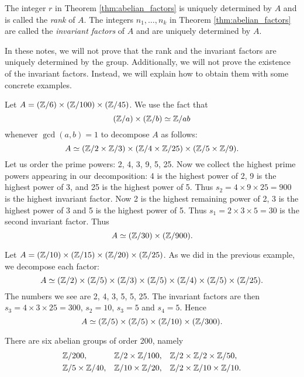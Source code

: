 The integer $r$ 
in Theorem \ref{thm:abelian_factors}
is uniquely determined by $A$ and 
is called the \emph{rank} of $A$. The integers $n_1,\dots,n_k$ 
in Theorem \ref{thm:abelian_factors}
are called the \emph{invariant factors} of $A$ and 
are uniquely determined by $A$. 

In these notes, we will not prove that the rank and the invariant factors are uniquely determined by the group. Additionally, we will not prove the existence 
of the invariant factors. Instead, we will explain how to obtain them with some concrete examples.

\begin{example}
    Let $A=(\mathbb{Z}/6)\times(\mathbb{Z}/100)\times(\mathbb{Z}/45)$. We use 
    the fact that 
    \[
    (\mathbb{Z}/a)\times(\mathbb{Z}/b)\simeq\mathbb{Z}/ab
    \]
    whenever $\gcd(a,b)=1$
    to decompose $A$ as follows:
    \[
    A\simeq (\mathbb{Z}/2\times\mathbb{Z}/3)\times(\mathbb{Z}/4\times\mathbb{Z}/25)\times(\mathbb{Z}/5\times\mathbb{Z}/9).
    \]
    Let us order the prime powers: 2, 4, 3, 9, 5, 25. 
    Now we collect the highest prime powers appearing in our decomposition: 4 is the highest power of 2,
    9 is the highest power of 3, and 25 is the highest power of 5. Thus 
    $s_2=4\times 9\times 25=900$ is the highest invariant factor. Now 
    2 is the highest remaining power of 2, 
    3 is the highest power of 3 and 5 is the highest power of 5. Thus 
    $s_1=2\times 3\times 5=30$ is the second invariant factor. 
    Thus 
    \[ 
    A\simeq (\mathbb{Z}/30)\times(\mathbb{Z}/900).
    \]
\end{example}

\begin{example}
    Let $A=(\mathbb{Z}/10)\times(\mathbb{Z}/15)\times(\mathbb{Z}/20)\times(\mathbb{Z}/25)$. 
    As we did in the previous example, we decompose each factor: 
    \[ 
    A\simeq (\mathbb{Z}/2)\times(\mathbb{Z}/5)\times(\mathbb{Z}/3)\times (\mathbb{Z}/5)\times(\mathbb{Z}/4)\times (\mathbb{Z}/5)\times(\mathbb{Z}/25). 
    \]
    The numbers we see are 2, 4, 3, 5, 5, 25. The invariant factors are
    then $s_3=4\times 3\times 25=300$, $s_2=10$, $s_3=5$ and $s_4=5$. 
    Hence 
    \[ 
    A\simeq (\mathbb{Z}/5)\times(\mathbb{Z}/5)\times(\mathbb{Z}/10)\times(\mathbb{Z}/300).
    \]
\end{example}

\begin{example}
    There are six abelian groups of order 200, namely
    \begin{align*}
        &\mathbb{Z}/{200}, 
        &&\mathbb{Z}/{2}\times\mathbb{Z}/{100}, 
        &&\mathbb{Z}/{2}\times\mathbb{Z}/{2}\times\mathbb{Z}/{50},\\ 
        &\mathbb{Z}/{5}\times\mathbb{Z}/{40}, 
        &&\mathbb{Z}/{10}\times\mathbb{Z}/{20}, 
        &&\mathbb{Z}/{2}\times\mathbb{Z}/{10}\times\mathbb{Z}/{10}.
    \end{align*}
\end{example}

